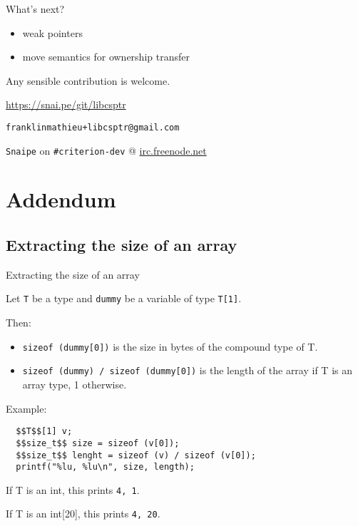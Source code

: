 \documentclass[10pt]{beamer}
\begin{document}

\begin{frame}[fragile]{What's next?}
  \begin{itemize}
    \item weak pointers
    \item move semantics for ownership transfer
  \end{itemize}

  \begin{center}
    Any sensible contribution is welcome.

    \large \faGithub \normalsize\hspace{0.7em}
    \url{https://snai.pe/git/libcsptr}

    \large \faEnvelope \normalsize\hspace{0.7em}
    \verb|franklinmathieu+libcsptr@gmail.com|

    \verb|Snaipe| on \verb|#criterion-dev| @ \url{irc.freenode.net}

  \end{center}
\end{frame}


\appendix
\section{Addendum}

\subsection{Extracting the size of an array}

\begin{frame}[fragile]{Extracting the size of an array}

  Let \verb|T| be a type and \verb|dummy| be a variable of type \verb|T[1]|.

  Then:

  \begin{itemize}
    \item \verb|sizeof (dummy[0])| is the size in bytes of the compound type of T.
    \item \verb|sizeof (dummy) / sizeof (dummy[0])| is the length of the array if T is an array type, 1 otherwise.
  \end{itemize}

  Example:
  \begin{lstlisting}
  $$T$$[1] v;
  $$size_t$$ size = sizeof (v[0]);
  $$size_t$$ lenght = sizeof (v) / sizeof (v[0]);
  printf("%lu, %lu\n", size, length);
  \end{lstlisting}

  If T is an int, this prints \verb|4, 1|.

  If T is an int[20], this prints \verb|4, 20|.

\end{frame}
\end{document}
